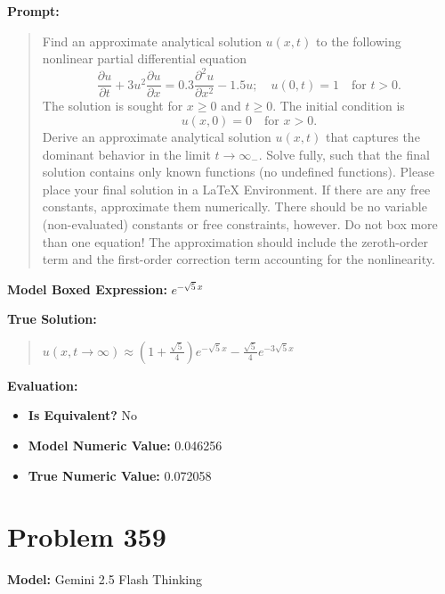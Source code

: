 \documentclass{article}
\begin{document}
{\textbf{Prompt:}
\begin{quote}
Find an approximate analytical solution $u(x, t)$ to the following nonlinear partial differential equation $$\frac{\partial u}{\partial t} + 3u^2 \frac{\partial u}{\partial x} = 0.3 \frac{\partial^2 u}{\partial x^2} - 1.5 u; \quad u(0, t) = 1 \quad \text{for } t > 0.$$ The solution is sought for $x \ge 0$ and $t \ge 0$. The initial condition is $$u(x, 0) = 0 \quad \text{for } x > 0.$$ Derive an approximate analytical solution $u(x, t)$ that captures the dominant behavior in the limit $t \rightarrow \infty_-$. Solve fully, such that the final solution contains only known functions (no undefined functions). Please place your final solution in a \boxed{} LaTeX Environment. If there are any free constants, approximate them numerically. There should be no variable (non-evaluated) constants or free constraints, however. Do not box more than one equation! The approximation should include the zeroth-order term and the first-order correction term accounting for the nonlinearity.
\end{quote}
\textbf{Model Boxed Expression:} $e^{-\sqrt{5} x}$

\textbf{True Solution:}
\begin{quote}
$u(x, t \rightarrow \infty) \approx \left(1 + \frac{\sqrt{5}}{4}\right) e^{-\sqrt{5}x} - \frac{\sqrt{5}}{4} e^{-3\sqrt{5}x}$
\end{quote}

\textbf{Evaluation:}
\begin{itemize}
\item \textbf{Is Equivalent?} No
\item \textbf{Model Numeric Value:} 0.046256
\item \textbf{True Numeric Value:} 0.072058
\end{itemize}
\vspace{1cm}
\section*{Problem 359}
\textbf{Model:} Gemini 2.5 Flash Thinking

}
\end{document}
